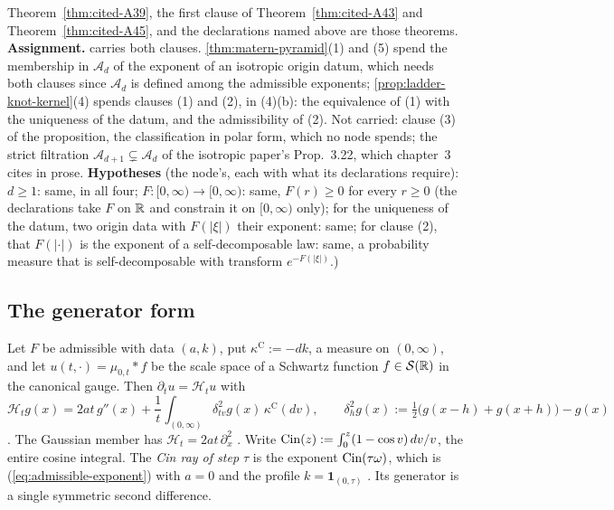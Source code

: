 \begin{theorem}
{Theorem~\ref{thm:cited-A39}, the first clause of Theorem~\ref{thm:cited-A43} and Theorem~\ref{thm:cited-A45}, and the
declarations named above are those theorems. \textbf{Assignment.}  carries both clauses. \ref{thm:matern-pyramid}(1) and (5)
spend the membership in $\mathcal{A}_d$ of the exponent of an isotropic origin datum, which needs
both clauses since $\mathcal{A}_d$ is defined among the admissible exponents;
\ref{prop:ladder-knot-kernel}(4) spends clauses (1) and (2), in (4)(b): the equivalence of (1)
with the uniqueness of the datum, and the admissibility of (2).
Not carried: clause (3) of the proposition, the classification in polar form, which no node spends;
the strict filtration $\mathcal{A}_{d+1} \subsetneq \mathcal{A}_d$ of the isotropic paper's
Prop.~3.22, which chapter~3 cites in prose.
\textbf{Hypotheses} (the node's, each with what its declarations require): $d \ge 1$: same, in all four;
$F : [0,\infty) \to [0,\infty)$: same, $F(r) \ge 0$ for every $r \ge 0$ (the declarations take $F$ on
$\mathbb{R}$ and constrain it on $[0,\infty)$ only); for the uniqueness of the datum, two origin data with
$F(|\xi|)$ their exponent: same; for clause (2), that $F(|\cdot|)$ is the exponent of a
self-decomposable law: same, a probability measure that is self-decomposable with transform
$e^{-F(|\xi|)}$.)}
\end{theorem}

\subsection{The generator form}
\label{subsec:cited-generator}

Let $F$ be admissible with data $(a, k)$, put $\kappa^{\mathrm C} := -dk$, a measure on
$(0,\infty)$, and let $u(t,\cdot) = \mu_{0,t} * f$ be the scale space of a Schwartz function
$f \in \mathcal{S}(\mathbb{R})$ in the canonical gauge. Then $\partial_t u = \mathcal{H}_t u$ with
\begin{equation}
\label{eq:generator-form}
\tag{2.0$''$}
  \mathcal{H}_t g(x) = 2at\,g''(x) + \frac1t\int_{(0,\infty)}\delta^2_{tv}g(x)\,
  \kappa^{\mathrm C}(dv), \qquad
  \delta^2_h g(x) := \tfrac12\bigl(g(x - h) + g(x + h)\bigr) - g(x)
\end{equation}
. The Gaussian member has
$\mathcal{H}_t = 2at\,\partial_x^2$ . Write
$\operatorname{Cin}(z) := \int_0^z(1 - \cos v)\,dv/v$, the entire cosine integral. The \emph{Cin ray of step
$\tau$} is the exponent $\operatorname{Cin}(\tau\omega)$, which is (\ref{eq:admissible-exponent}) with $a = 0$ and
the profile $k = \mathbf{1}_{(0,\tau)}$ . Its generator is a
single symmetric second difference.


